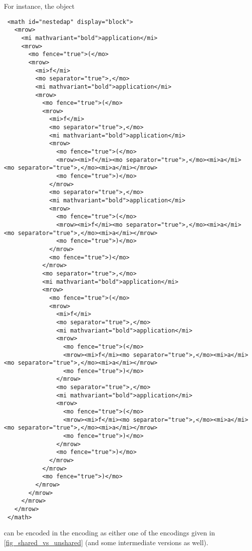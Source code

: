 \begin{description}
 For instance, the \OM object
\begin{lstlisting}
 <math id="nestedap" display="block">
   <mrow>
     <mi mathvariant="bold">application</mi>
     <mrow>
       <mo fence="true">(</mo>
       <mrow>
         <mi>f</mi>
         <mo separator="true">,</mo>
         <mi mathvariant="bold">application</mi>
         <mrow>
           <mo fence="true">(</mo>
           <mrow>
             <mi>f</mi>
             <mo separator="true">,</mo>
             <mi mathvariant="bold">application</mi>
             <mrow>
               <mo fence="true">(</mo>
               <mrow><mi>f</mi><mo separator="true">,</mo><mi>a</mi><mo separator="true">,</mo><mi>a</mi></mrow>
               <mo fence="true">)</mo>
             </mrow>
             <mo separator="true">,</mo>
             <mi mathvariant="bold">application</mi>
             <mrow>
               <mo fence="true">(</mo>
               <mrow><mi>f</mi><mo separator="true">,</mo><mi>a</mi><mo separator="true">,</mo><mi>a</mi></mrow>
               <mo fence="true">)</mo>
             </mrow>
             <mo fence="true">)</mo>
           </mrow>
           <mo separator="true">,</mo>
           <mi mathvariant="bold">application</mi>
           <mrow>
             <mo fence="true">(</mo>
             <mrow>
               <mi>f</mi>
               <mo separator="true">,</mo>
               <mi mathvariant="bold">application</mi>
               <mrow>
                 <mo fence="true">(</mo>
                 <mrow><mi>f</mi><mo separator="true">,</mo><mi>a</mi><mo separator="true">,</mo><mi>a</mi></mrow>
                 <mo fence="true">)</mo>
               </mrow>
               <mo separator="true">,</mo>
               <mi mathvariant="bold">application</mi>
               <mrow>
                 <mo fence="true">(</mo>
                 <mrow><mi>f</mi><mo separator="true">,</mo><mi>a</mi><mo separator="true">,</mo><mi>a</mi></mrow>
                 <mo fence="true">)</mo>
               </mrow>
               <mo fence="true">)</mo>
             </mrow>
           </mrow>
           <mo fence="true">)</mo>
         </mrow>
       </mrow>
     </mrow>
   </mrow>
 </math>
\end{lstlisting}
can be encoded in the \XML encoding as either one of the \XML encodings given in
\ref{fig_shared_vs_unshared} (and some intermediate versions as well).
\end{description}

